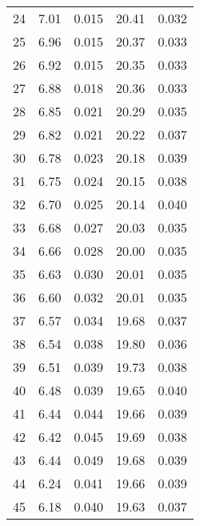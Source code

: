 \begin{table}
\begin{tabular}{c|ll|ll}
24 & 7.01 & 0.015 & 20.41 & 0.032 \\
25 & 6.96 & 0.015 & 20.37 & 0.033 \\
26 & 6.92 & 0.015 & 20.35 & 0.033 \\
27 & 6.88 & 0.018 & 20.36 & 0.033 \\
28 & 6.85 & 0.021 & 20.29 & 0.035 \\
29 & 6.82 & 0.021 & 20.22 & 0.037 \\
30 & 6.78 & 0.023 & 20.18 & 0.039 \\
31 & 6.75 & 0.024 & 20.15 & 0.038 \\
32 & 6.70 & 0.025 & 20.14 & 0.040 \\
33 & 6.68 & 0.027 & 20.03 & 0.035 \\
34 & 6.66 & 0.028 & 20.00 & 0.035 \\
35 & 6.63 & 0.030 & 20.01 & 0.035 \\
36 & 6.60 & 0.032 & 20.01 & 0.035 \\
37 & 6.57 & 0.034 & 19.68 & 0.037 \\
38 & 6.54 & 0.038 & 19.80 & 0.036 \\
39 & 6.51 & 0.039 & 19.73 & 0.038 \\
40 & 6.48 & 0.039 & 19.65 & 0.040 \\
41 & 6.44 & 0.044 & 19.66 & 0.039 \\
42 & 6.42 & 0.045 & 19.69 & 0.038 \\
43 & 6.44 & 0.049 & 19.68 & 0.039 \\
44 & 6.24 & 0.041 & 19.66 & 0.039 \\
45 & 6.18 & 0.040 & 19.63 & 0.037 \\
               \hline
        \end{tabular}
    \end{table}
    \clearpage

